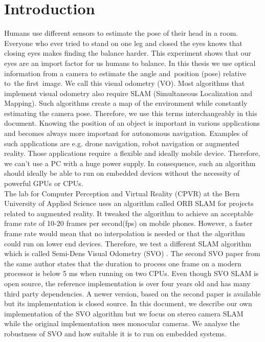 \documentclass[11pt,a4paper,titlepage,oneside]{report}
\begin{document}
\tableofcontents

\chapter{Introduction}

Humans use different sensors to estimate the pose of their head in a room. Everyone who ever tried to stand on one leg and closed the eyes knows that closing eyes makes finding the balance harder. This experiment shows that our eyes are an import factor for us humans to balance. In this thesis we use optical information from a camera to estimate the angle and position (pose) relative to the first image. We call this visual odometry (VO). Most algorithms that implement visual odometry also require SLAM (Simultaneous Localization and Mapping). Such algorithms create a map of the environment while constantly estimating the camera pose. Therefore, we use this terms interchangeably in this document. Knowing the position of an object is important in various applications and becomes always more important for autonomous navigation. Examples of such applications are e.g. drone navigation, robot navigation or augmented reality. Those applications require a flexible and ideally mobile device. Therefore, we can’t use a PC with a huge power supply. In consequence, such an algorithm should ideally be able to run on embedded devices without the necessity of powerful GPUs or CPUs.\\
The lab for Computer Perception and Virtual Reality (CPVR) at the Bern University of Applied Science uses an algorithm called ORB SLAM \cite{orbslam} for projects related to augmented reality. It tweaked the algorithm to achieve an acceptable frame rate of 10-20 frames per second(fps) on mobile phones. However, a faster frame rate would mean that no interpolation is needed or that the algorithm could run on lower end devices. Therefore, we test a different SLAM algorithm which is called Semi-Dens Visual Odometry (SVO) \cite{svo}. The second SVO paper \cite{svo2} from the same author states that the duration to process one frame on a modern processor is below 5 ms when running on two CPUs. Even though SVO SLAM is open source, the reference implementation is over four years old and has many third party dependencies. A newer version, based on the second paper is available but its implementation is closed source. In this document, we describe our own implementation of the SVO algorithm but we focus on stereo camera SLAM while the original implementation uses monocular cameras. We analyse the robustness of SVO and how suitable it is to run on embedded systems.
\end{document}
